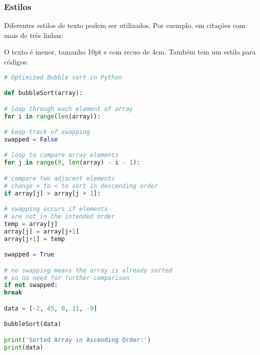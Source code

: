 \subsubsection{Estilos}

Diferentes estilos de texto podem ser utilizados. Por exemplo, em citações com mais de três linhas:

\begin{ABNTCiteLong}
    \lipsum[1]
\end{ABNTCiteLong}

O texto é menor, tamanho 10pt e com recuo de 4cm. Também tem um estilo para códigos:


\begin{lstlisting}[language=Python, caption={Bubble Sort em Python.}]
# Optimized Bubble sort in Python

def bubbleSort(array):

# loop through each element of array
for i in range(len(array)):

# keep track of swapping
swapped = False

# loop to compare array elements
for j in range(0, len(array) - i - 1):

# compare two adjacent elements
# change > to < to sort in descending order
if array[j] > array[j + 1]:

# swapping occurs if elements
# are not in the intended order
temp = array[j]
array[j] = array[j+1]
array[j+1] = temp

swapped = True

# no swapping means the array is already sorted
# so no need for further comparison
if not swapped:
break

data = [-2, 45, 0, 11, -9]

bubbleSort(data)

print('Sorted Array in Ascending Order:')
print(data)

\end{lstlisting}
